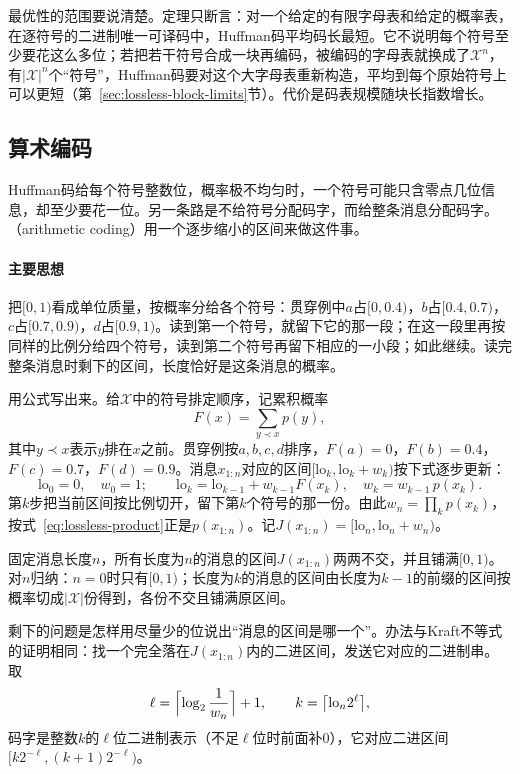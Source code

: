 最优性的范围要说清楚。定理只断言：对一个给定的有限字母表和给定的概率表，在逐符号的二进制唯一可译码中，Huffman码平均码长最短。它不说明每个符号至少要花这么多位；若把若干符号合成一块再编码，被编码的字母表就换成了$\mathcal{X}^n$，有$\lvert\mathcal{X}\rvert^n$个“符号”，Huffman码要对这个大字母表重新构造，平均到每个原始符号上可以更短（第~\ref{sec:lossless-block-limits}节）。代价是码表规模随块长指数增长。

\subsection{算术编码}
\label{sec:lossless-arithmetic}

Huffman码给每个符号整数位，概率极不均匀时，一个符号可能只含零点几位信息，却至少要花一位。另一条路是不给符号分配码字，而给整条消息分配码字。（arithmetic coding）用一个逐步缩小的区间来做这件事。

\paragraph{主要思想}
把$[0,1)$看成单位质量，按概率分给各个符号：贯穿例中$a$占$[0,0.4)$，$b$占$[0.4,0.7)$，$c$占$[0.7,0.9)$，$d$占$[0.9,1)$。读到第一个符号，就留下它的那一段；在这一段里再按同样的比例分给四个符号，读到第二个符号再留下相应的一小段；如此继续。读完整条消息时剩下的区间，长度恰好是这条消息的概率。

用公式写出来。给$\mathcal{X}$中的符号排定顺序，记累积概率
\[
 F(x)=\sum_{y\prec x}p(y),
\]
其中$y\prec x$表示$y$排在$x$之前。贯穿例按$a,b,c,d$排序，$F(a)=0$，$F(b)=0.4$，$F(c)=0.7$，$F(d)=0.9$。消息$x_{1:n}$对应的区间$[\mathrm{lo}_k,\mathrm{lo}_k+w_k)$按下式逐步更新：
\begin{equation}
 \mathrm{lo}_0=0,\quad w_0=1;\qquad
 \mathrm{lo}_k=\mathrm{lo}_{k-1}+w_{k-1}F(x_k),\quad w_k=w_{k-1}\,p(x_k).
 \label{eq:lossless-arith-update}
\end{equation}
第$k$步把当前区间按比例切开，留下第$k$个符号的那一份。由此$w_n=\prod_{k}p(x_k)$，按式~\eqref{eq:lossless-product}正是$p(x_{1:n})$。记$J(x_{1:n})=[\mathrm{lo}_n,\mathrm{lo}_n+w_n)$。

固定消息长度$n$，所有长度为$n$的消息的区间$J(x_{1:n})$两两不交，并且铺满$[0,1)$。对$n$归纳：$n=0$时只有$[0,1)$；长度为$k$的消息的区间由长度为$k-1$的前缀的区间按概率切成$\lvert\mathcal{X}\rvert$份得到，各份不交且铺满原区间。

剩下的问题是怎样用尽量少的位说出“消息的区间是哪一个”。办法与Kraft不等式的证明相同：找一个完全落在$J(x_{1:n})$内的二进区间，发送它对应的二进制串。取
\begin{equation}
 \ell=\Bigl\lceil\log_2\frac{1}{w_n}\Bigr\rceil+1,\qquad
 k=\bigl\lceil\mathrm{lo}_n2^{\ell}\bigr\rceil ,
 \label{eq:lossless-arith-codeword}
\end{equation}
码字是整数$k$的$\ell$位二进制表示（不足$\ell$位时前面补$0$），它对应二进区间$[k2^{-\ell},(k+1)2^{-\ell})$。

